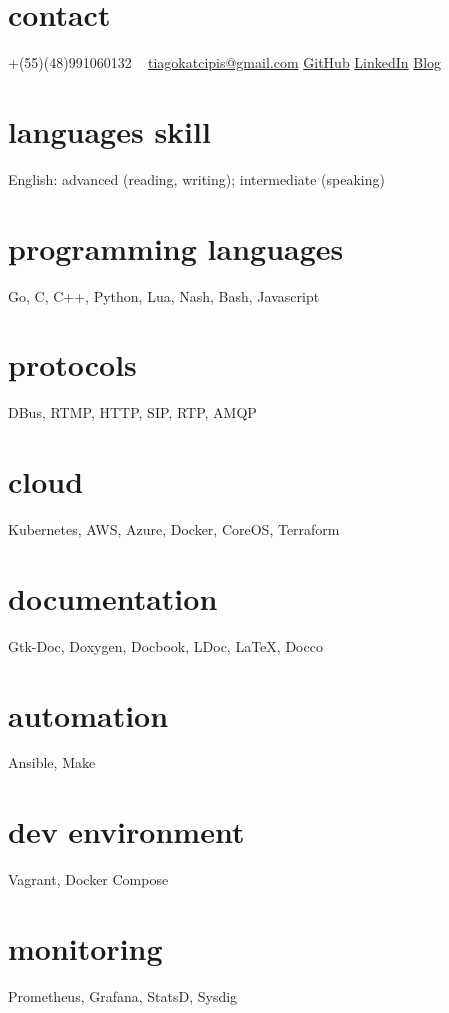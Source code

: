 \documentclass[]{friggeri-cv} %
\begin{document}


\begin{aside} %
\section{contact}
+(55)(48)991060132
~
\href{mailto:tiagokatcipis@gmail.com}{tiagokatcipis@gmail.com}
\href{https://github.com/katcipis}{GitHub}
\href{http://www.linkedin.com/pub/tiago-katcipis/1b/273/8b0}{LinkedIn}
\href{http://katcipis.github.io/}{Blog}
\section{languages skill}
English: advanced (reading, writing); intermediate (speaking)
\section{programming languages}
Go, C, C++, Python, Lua, Nash, Bash, Javascript
\section{protocols}
DBus, RTMP, HTTP, SIP, RTP, AMQP
\section{cloud}
Kubernetes, AWS, Azure, Docker, CoreOS, Terraform
\section{documentation}
Gtk-Doc, Doxygen, Docbook, LDoc, LaTeX, Docco
\section{automation}
Ansible, Make
\section{dev environment}
Vagrant, Docker Compose
\section{monitoring}
Prometheus, Grafana, StatsD, Sysdig
\end{aside}
\end{document}
